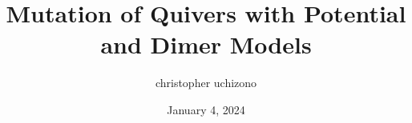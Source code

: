 \documentclass{beamer}
\title{Mutation of Quivers with Potential \\and Dimer Models}
\author{christopher uchizono}
\institute{University of the Pacific}
\date{January 4, 2024}
\begin{document}
    \justifying

    
    

    
    
    

    
\end{document}

